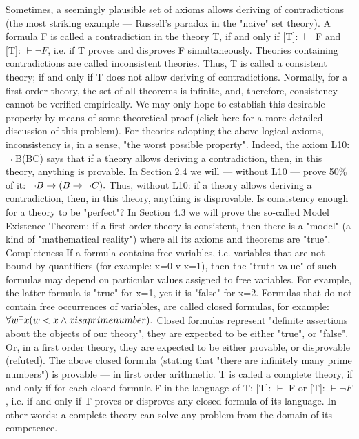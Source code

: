 Sometimes, a seemingly plausible set of axioms allows deriving of contradictions (the most striking
example --- Russell's paradox in the "naive" set theory). A formula F is called a contradiction in the
theory T, if and only if [T]: \(\vdash\) F and [T]: \(\vdash \neg F\), i.e. if T proves and disproves F simultaneously. Theories
containing contradictions are called inconsistent theories. Thus, T is called a consistent theory; if and
only if T does not allow deriving of contradictions.
Normally, for a first order theory, the set of all theorems is infinite, and, therefore, consistency cannot be
verified empirically. We may only hope to establish this desirable property by means of some
theoretical proof (click here for a more detailed discussion of this problem).
For theories adopting the above logical axioms, inconsistency is, in a sense, "the worst possible property".
Indeed, the axiom L10: \(\neg\) B\IMPLIES (B\IMPLIES C) says that if a theory allows deriving a contradiction, then, in this
theory, anything is provable. In Section 2.4 we will --- without L10 --- prove 50\% of it: \(\neg B\rightarrow (B\rightarrow \neg C).\)
Thus, without L10: if a theory allows deriving a contradiction, then, in this theory, anything is
disprovable.
Is consistency enough for a theory to be "perfect"? In Section 4.3 we will prove the so-called Model
Existence Theorem: if a first order theory is consistent, then there is a "model" (a kind of "mathematical
reality") where all its axioms and theorems are "true".
Completeness
If a formula contains free variables, i.e. variables that are not bound by quantifiers (for example: x=0 v
x=1), then the "truth value" of such formulas may depend on particular values assigned to free variables.
For example, the latter formula is "true" for x=1, yet it is "false" for x=2. Formulas that do not contain
free occurrences of variables, are called closed formulas, for example:
\(\forall w\exists x( w<x \wedge  x is a prime number).\)
Closed formulas represent "definite assertions about the objects of our theory", they are expected to be
either "true", or "false". Or, in a first order theory, they are expected to be either provable, or disprovable
(refuted). The above closed formula (stating that "there are infinitely many prime numbers") is provable ---
in first order arithmetic.
T is called a complete theory, if and only if for each closed formula F in the language of T: [T]: \(\vdash\) F or
[T]: \(\vdash \neg F\), i.e. if and only if T proves or disproves any closed formula of its language. In other words: a
complete theory can solve any problem from the domain of its competence.
